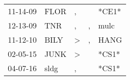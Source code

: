 \begin{supertabular}{lllll}
 11-14-09 &  FLOR &             , &    &  *CE1* \\
 12-13-09 &   TNR &             , &  , &   mulc \\
 11-12-10 &  BILY &  \textgreater &  , &   HANG \\
 02-05-15 &  JUNK &  \textgreater &    &  *CS1* \\
 04-07-16 &  sldg &             , &    &  *CS1* \\
\end{supertabular}
